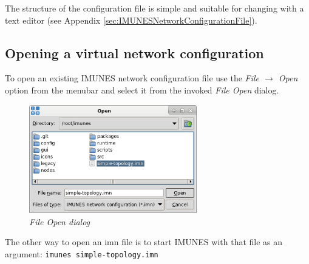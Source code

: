 The structure of the configuration file is simple and suitable for changing
with a text editor (see Appendix \ref{sec:IMUNESNetworkConfigurationFile}).

\subsection{Opening a virtual network configuration}
To open an existing IMUNES network configuration file use the \emph{File $\to$
Open} option from the menubar and select it from the invoked \emph{File Open}
dialog. 

\begin{figure}[H]
\centering
\vspace{10pt}
\includegraphics[width=0.65\textwidth]{./images/file_open.png}
\caption{\emph{File Open dialog}}
\label{fig:file_open}
\end{figure}

The other way to open an imn file is to start IMUNES with that file as an
argument: \texttt{imunes simple-topology.imn}
